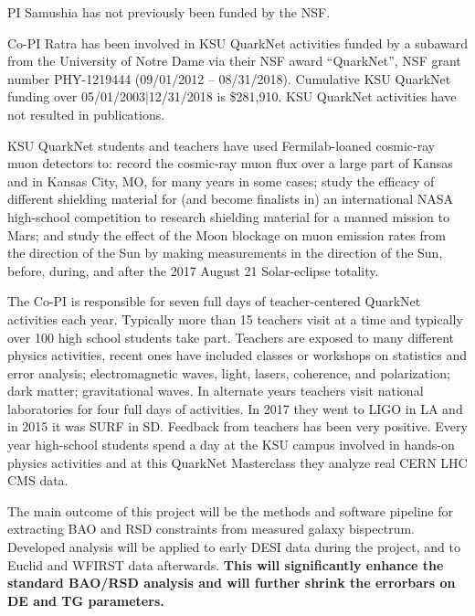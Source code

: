 
PI Samushia has not previously been funded by the NSF.

Co-PI Ratra has been involved in  KSU QuarkNet activities funded by a subaward
from the University of Notre Dame via their NSF award ``QuarkNet'', NSF grant
number PHY-1219444 (09/01/2012 -- 08/31/2018).  Cumulative KSU QuarkNet funding
over 05/01/2003|12/31/2018 is \$281,910. KSU QuarkNet activities have not
resulted in publications. 

KSU QuarkNet students and teachers have used Fermilab-loaned cosmic-ray muon
detectors to: record the cosmic-ray muon flux over a large part of Kansas and
in Kansas City, MO, for many years in some cases; study the efficacy of
different shielding material for (and become finalists in) an international
NASA high-school competition to research shielding material for a manned
mission to Mars; and study the effect of the Moon blockage on muon emission
rates from the direction of the Sun by making measurements in the direction of
the Sun, before, during, and after the 2017 August 21 Solar-eclipse totality.

The Co-PI is responsible for seven full days of teacher-centered QuarkNet
activities each year. Typically more than 15 teachers visit at a time and
typically over 100 high school students take part. Teachers are exposed to many
different physics activities, recent ones have included classes or workshops on
statistics and error analysis; electromagnetic waves, light, lasers, coherence,
and polarization; dark matter; gravitational waves.  In alternate years
teachers visit national laboratories for four full days of activities. In 2017
they went to LIGO in LA and in 2015 it was SURF in SD.  Feedback from teachers
has been very positive. Every year high-school students spend a day at the KSU
campus involved in hands-on physics activities and at this QuarkNet Masterclass
they analyze real CERN LHC CMS data.


The main outcome of this project will be the methods and software pipeline for
extracting BAO and RSD constraints from measured galaxy bispectrum. Developed
analysis will be applied to early DESI data during the project, and to Euclid
and WFIRST data afterwards. \textbf{This will significantly enhance the
standard BAO/RSD analysis and will further shrink the errorbars on DE and TG
parameters.}


